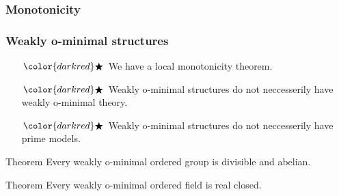 \begin{frame}[t]\frametitle{Monotonicity}

\end{frame}

\begin{frame}[t]\frametitle{Weakly o-minimal structures}

    
	\begin{itemize}
		\item[$\color{darkred}\bigstar$] We have a local monotonicity theorem.
		\item[$\color{darkred}\bigstar$] Weakly o-minimal structures do not neccesserily have weakly o-minimal theory.
		\item[$\color{darkred}\bigstar$] Weakly o-minimal structures do not neccesserily have prime models.
	\end{itemize}

	\begin{beamerboxesrounded}[shadow=true]{Theorem}
		Every weakly o-minimal ordered group is divisible and abelian.
	\end{beamerboxesrounded}

	\begin{beamerboxesrounded}[shadow=true]{Theorem}
		Every weakly o-minimal ordered field is real closed.
	\end{beamerboxesrounded}
\end{frame}

